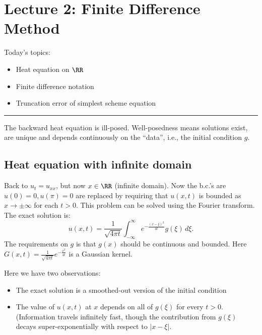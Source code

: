 \newpage 
\section{Lecture 2: Finite Difference Method} 

Today's topics: 
\begin{itemize}
    \item Heat equation on $ \RR $ 
    \item Finite difference notation 
    \item Truncation error of simplest scheme equation  
\end{itemize}

\vspace{1em}
\hrule 
\vspace{1em} 


\begin{note}
The backward heat equation is ill-posed. Well-posedness means solutions exist, are unique and depends continuously on the ``data'', i.e., the initial condition $g$. 
\end{note}

\subsection{Heat equation with infinite domain}
Back to $u_t = u_{xx}$, but now $x\in \RR$ (infinite domain).  Now the b.c.'s are $ u(0)=0, u(\pi)=0 $ are replaced by requiring that $u(x,t)$ is bounded as $ x\to \pm \infty$ for each $t>0$.  This problem can be solved using the Fourier transform. The exact solution is: 
\[
    u(x,t) = \frac{1}{\sqrt{4\pi t} }\int_{-\infty}^{\infty} e^{-\frac{(x-\xi)^2}{4t}} g(\xi)\, d\xi.   
\]
The requirements on $g$ is that $g(x)$ should be continuous and bounded.  Here $G(x,t) = \frac{1}{\sqrt{4\pi t} }e^{-\frac{x^2}{4t}}$ is a Gaussian kernel. 


\begin{remark}
Here we have two observations: 
\begin{itemize}
    \item The exact solution is a smoothed-out version of the initial condition
    \item The value of $ u(x,t) $ at $x$ depends on all of $g(\xi)$ for every $t>0$. (Information travels infinitely fast, though the contribution from $g(\xi)$ decays super-exponentially with respect to $|x-\xi|$. 
\end{itemize}
\end{remark}

